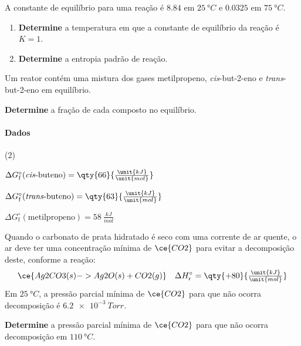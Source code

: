 \begin{problem}[
	id={2F63},
	path={/home/braun/Documents/Developer/braunchem/data/problems/Q2/2F/2F63}
]
A constante de equilíbrio para uma reação é {\(\num{8,84}\)} em {\(\qty{25}{\unit{\degree C}}\)} e {\(\num{0,0325}\)} em
{\(\qty{75}{\unit{\degree C}}\)}.

\begin{enumerate}
\def\labelenumi{\alph{enumi}.}
\tightlist
\item
  \textbf{Determine} a temperatura em que a constante de equilíbrio da reação é {\(K = 1\)}.
\item
  \textbf{Determine} a entropia padrão de reação.
\end{enumerate}

\end{problem}


\begin{problem}[
	id={2F64},
	path={/home/braun/Documents/Developer/braunchem/data/problems/Q2/2F/2F64}
]
Um reator contém uma mistura dos gases metilpropeno, \emph{cis}-but-2-eno e \emph{trans}-but-2-eno em equilíbrio.

\textbf{Determine} a fração de cada composto no equilíbrio.
\paragraph{Dados}\small 
\begin{datalist}
[start = 1](2)\item $\Delta G_\text{f}^\circ(\text{\textit{cis}-buteno}) = \qty{66}{\tfrac{\unit{kJ}}{\unit{mol}}}$
\item $\Delta G_\text{f}^\circ(\text{\textit{trans}-buteno}) = \qty{63}{\tfrac{\unit{kJ}}{\unit{mol}}}$
\item $\Delta G_\text{f}^\circ(\text{metilpropeno}) = \qty{58}{\tfrac{\unit{kJ}}{\unit{mol}}}$
\end{datalist}

\end{problem}


\begin{problem}[
	id={2F65},
	path={/home/braun/Documents/Developer/braunchem/data/problems/Q2/2F/2F65}
]
Quando o carbonato de prata hidratado é seco com uma corrente de ar quente, o ar deve ter uma concentração mínima de {\(\ce{CO2}\)} para evitar a
decomposição deste, conforme a reação: {\[
    \ce{ Ag2CO3(s) -> Ag2O(s) + CO2(g) } \quad \Delta
H^\circ_\mathrm{r} = \qty{+80}{\tfrac{\unit{kJ}}{\unit{mol}}}
\]} Em {\(\qty{25}{\unit{\degree C}}\)}, a pressão parcial mínima de {\(\ce{CO2}\)} para que não ocorra decomposição é
{\(\qty{6,2e-3}{\unit{Torr}}\)}.

\textbf{Determine} a pressão parcial mínima de {\(\ce{CO2}\)} para que não ocorra decomposição em {\(\qty{110}{\unit{\degree C}}\)}.

\end{problem}


